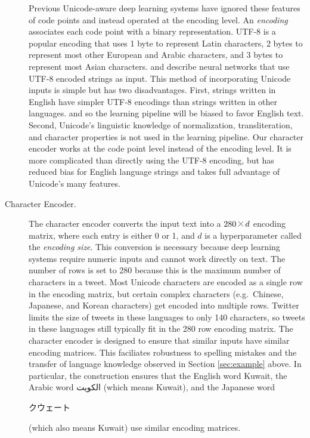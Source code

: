 \documentclass[sigconf,anonymous,review]{acmart}
\renewcommand{\times}{\mathbin{\tikz [x=1.4ex,y=1.4ex,line width=.1ex] \draw (0,0) -- (1,1) (0,1) -- (1,0);}}%
\newcommand{\defn}[1]{\textit{#1}}
\begin{document}
\begin{description}
Previous Unicode-aware deep learning systems have ignored these features of code points and instead operated at the encoding level.
An \defn{encoding} associates each code point with a binary representation. 
UTF-8 is a popular encoding that uses 1 byte to represent Latin characters,
2 bytes to represent most other European and Arabic characters,
and 3 bytes to represent most Asian characters.
\citet{gillick2015multilingual} and \citet{plank2016multilingual} describe neural networks that use UTF-8 encoded strings as input.
This method of incorporating Unicode inputs is simple but has two disadvantages.
First, strings written in English have simpler UTF-8 encodings than strings written in other languages.
and so the learning pipeline will be biased to favor English text.
Second, Unicode's linguistic knowledge of normalization, transliteration, and character properties is not used in the learning pipeline.
Our character encoder works at the code point level instead of the encoding level.
It is more complicated than directly using the UTF-8 encoding,
but has reduced bias for English language strings and takes full advantage of Unicode's many features.

\item[Character Encoder.]
The character encoder converts the input text into a $280\times d$ encoding matrix,
where each entry is either 0 or 1,
and $d$ is a hyperparameter called the \defn{encoding size}.
This conversion is necessary because deep learning systems require numeric inputs and cannot work directly on text.
The number of rows is set to 280 because this is the maximum number of characters in a tweet.
Most Unicode characters are encoded as a single row in the encoding matrix,
but certain complex characters (e.g.\ Chinese, Japanese, and Korean characters) get encoded into multiple rows.
Twitter limits the size of tweets in these languages to only 140 characters,
so tweets in these languages still typically fit in the 280 row encoding matrix.
The character encoder is designed to ensure that similar inputs have similar encoding matrices.
This faciliates robustness to spelling mistakes and the transfer of language knowledge observed in Section \ref{sec:example} above.
In particular, the construction ensures that the English word Kuwait, 
the Arabic word \foreignlanguage{arabic}{الكويت} (which means Kuwait), 
and the Japanese word \begin{CJK}{UTF8}{min}クウェート\end{CJK} (which also means Kuwait)
use similar encoding matrices.


\end{description}
\end{document}
